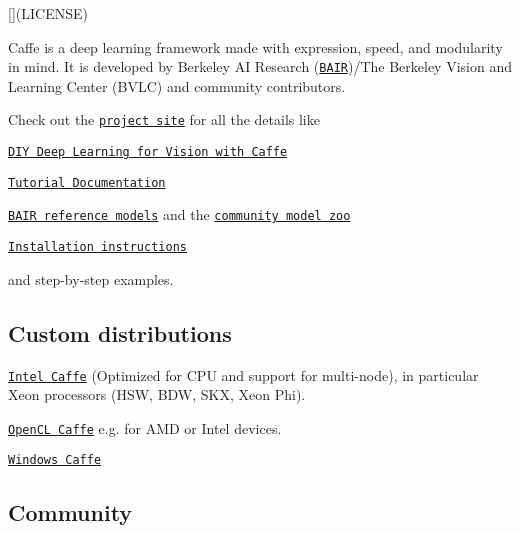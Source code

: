 \href{https://travis-ci.org/BVLC/caffe}{\tt } \mbox{[}\mbox{]}(L\+I\+C\+E\+N\+SE)

Caffe is a deep learning framework made with expression, speed, and modularity in mind. It is developed by Berkeley AI Research (\href{http://bair.berkeley.edu}{\tt B\+A\+IR})/\+The Berkeley Vision and Learning Center (B\+V\+LC) and community contributors.

Check out the \href{http://caffe.berkeleyvision.org}{\tt project site} for all the details like


\begin{DoxyItemize}
\item \href{https://docs.google.com/presentation/d/1UeKXVgRvvxg9OUdh_UiC5G71UMscNPlvArsWER41PsU/edit#slide=id.p}{\tt D\+IY Deep Learning for Vision with Caffe}
\item \href{http://caffe.berkeleyvision.org/tutorial/}{\tt Tutorial Documentation}
\item \href{http://caffe.berkeleyvision.org/model_zoo.html}{\tt B\+A\+IR reference models} and the \href{https://github.com/BVLC/caffe/wiki/Model-Zoo}{\tt community model zoo}
\item \href{http://caffe.berkeleyvision.org/installation.html}{\tt Installation instructions}
\end{DoxyItemize}

and step-\/by-\/step examples.

\subsection*{Custom distributions}


\begin{DoxyItemize}
\item \href{https://github.com/BVLC/caffe/tree/intel}{\tt Intel Caffe} (Optimized for C\+PU and support for multi-\/node), in particular Xeon processors (H\+SW, B\+DW, S\+KX, Xeon Phi).
\end{DoxyItemize}

\href{https://github.com/BVLC/caffe/tree/opencl}{\tt Open\+CL Caffe} e.\+g. for A\+MD or Intel devices.
\begin{DoxyItemize}
\item \href{https://github.com/BVLC/caffe/tree/windows}{\tt Windows Caffe}
\end{DoxyItemize}

\subsection*{Community}

